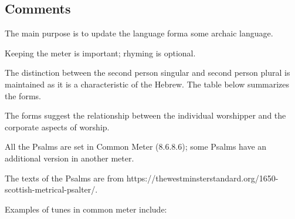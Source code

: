 \subsection*{Comments}

The main purpose is to update the language forma some archaic language.

Keeping the meter is important; rhyming is optional.

The distinction between the second person singular and second person plural is maintained as it is a characteristic of the Hebrew. The table below summarizes the forms.

The forms suggest the relationship between the individual worshipper and the corporate aspects of worship.

All the Psalms are set in Common Meter (8.6.8.6); some Psalms have an additional version in another meter.

The texts of the Psalms are from https://thewestminsterstandard.org/1650-scottish-metrical-psalter/.

Examples of tunes in common meter include:

